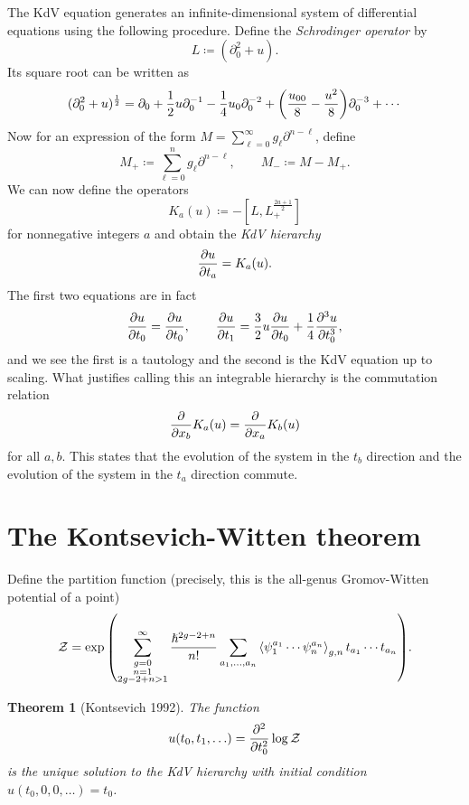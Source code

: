 \documentclass{amsart}
\newtheorem{thm}{Theorem}[section]
\theoremstyle{definition}
\theoremstyle{remark}
\theoremstyle{plain}
\theoremstyle{definition}
\theoremstyle{remark}
\newcommand{\mc}[1]{\mathcal{#1}}
\newcommand{\1}{\mathbf{1}}
\newcommand{\2}{\mathbf{2}}
\newcommand{\3}{\mathbf{3}}
\begin{document}
The KdV equation generates an infinite-dimensional system of differential equations using the following procedure. Define the \textit{Schrodinger operator} by
\[ L \coloneqq (\partial_0^2 + u). \]
Its square root can be written as
\[ (\partial_0^2 + u)^{\frac{1}{2}} = \partial_0 + \frac{1}{2} u \partial_0^{-1} - \frac{1}{4} u_0 \partial_0^{-2} + \qty(\frac{u_{00}}{8} - \frac{u^2}{8}) \partial_0^{-3} + \cdots \]
Now for an expression of the form $M = \sum_{\ell=0}^{\infty} g_{\ell} \partial^{n-\ell}$, define
\[ M_+ \coloneqq \sum_{\ell=0}^n g_{\ell} \partial^{n-\ell}, \qquad M_- \coloneqq M - M_+. \]
We can now define the operators
\[ K_{a}(u) \coloneqq -[L, L^{\frac{2a+1}{2}}_+] \]
for nonnegative integers $a$ and obtain the \textit{KdV hierarchy}
\[ \pdv{u}{t_a} = K_a(u). \]
The first two equations are in fact
\[ \pdv{u}{t_0} = \pdv{u}{t_0}, \qquad \pdv{u}{t_1} = \frac{3}{2} u \pdv{u}{t_0} + \frac{1}{4} \pdv[3]{u}{t_0}, \]
and we see the first is a tautology and the second is the KdV equation up to scaling. What justifies calling this an integrable hierarchy is the commutation relation
\[ \pdv{x_b} K_a(u) = \pdv{x_a} K_b(u) \]
for all $a,b$. This states that the evolution of the system in the $t_b$ direction and the evolution of the system in the $t_a$ direction commute.

\section{The Kontsevich-Witten theorem}

Define the partition function (precisely, this is the all-genus Gromov-Witten potential of a point)
\[ \mc{Z} = \exp\qty(\sum_{\substack{g=0 \\ n=1 \\ 2g-2+n > 1}}^{\infty} \frac{\hslash^{2g-2+n}}{n!} \sum_{a_1, \ldots, a_n} \ev{\psi_1^{a_1} \cdots \psi_n^{a_n}}_{g,n} t_{a_1} \cdots t_{a_n}). \]

\begin{thm}[Kontsevich 1992]
    The function
    \[ u(t_0, t_1, \ldots) = \pdv[2]{t_0} \log \mc{Z} \]
    is the unique solution to the KdV hierarchy with initial condition $u(t_0, 0, 0, \ldots) = t_0$.
\end{thm}
\end{document}
